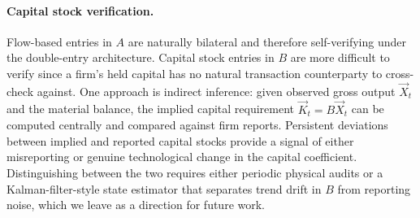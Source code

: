 \paragraph{Capital stock verification.}
Flow-based entries in $A$ are naturally bilateral and therefore self-verifying
under the double-entry architecture. Capital stock entries in $B$ are more
difficult to verify since a firm's held capital has no natural transaction
counterparty to cross-check against. One approach is indirect inference:
given observed gross output $\vec{X}_t$ and the material balance, the implied
capital requirement $\vec{K}_t = B\vec{X}_t$ can be computed centrally and
compared against firm reports. Persistent deviations between implied and
reported capital stocks provide a signal of either misreporting or genuine
technological change in the capital coefficient. Distinguishing between the
two requires either periodic physical audits or a Kalman-filter-style state
estimator that separates trend drift in $B$ from reporting noise, which we
leave as a direction for future work.
